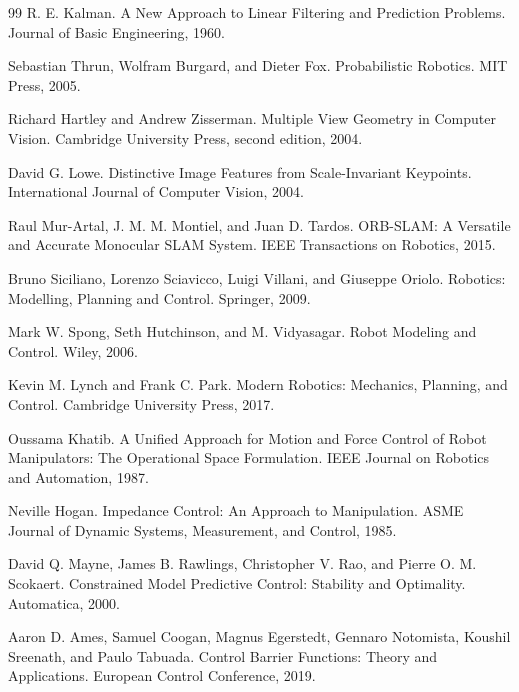 \documentclass[11pt,oneside,openany]{oblivoir}
\numberwithin{section}{chapter}
\numberwithin{subsection}{section}
\numberwithin{equation}{chapter}
\begin{document}
\backmatter

\clearpage

\begin{thebibliography}{99}
R. E. Kalman.
\newblock A New Approach to Linear Filtering and Prediction Problems.
\newblock Journal of Basic Engineering, 1960.

Sebastian Thrun, Wolfram Burgard, and Dieter Fox.
\newblock Probabilistic Robotics.
\newblock MIT Press, 2005.

Richard Hartley and Andrew Zisserman.
\newblock Multiple View Geometry in Computer Vision.
\newblock Cambridge University Press, second edition, 2004.

David G. Lowe.
\newblock Distinctive Image Features from Scale-Invariant Keypoints.
\newblock International Journal of Computer Vision, 2004.

Raul Mur-Artal, J. M. M. Montiel, and Juan D. Tardos.
\newblock ORB-SLAM: A Versatile and Accurate Monocular SLAM System.
\newblock IEEE Transactions on Robotics, 2015.

Bruno Siciliano, Lorenzo Sciavicco, Luigi Villani, and Giuseppe Oriolo.
\newblock Robotics: Modelling, Planning and Control.
\newblock Springer, 2009.

Mark W. Spong, Seth Hutchinson, and M. Vidyasagar.
\newblock Robot Modeling and Control.
\newblock Wiley, 2006.

Kevin M. Lynch and Frank C. Park.
\newblock Modern Robotics: Mechanics, Planning, and Control.
\newblock Cambridge University Press, 2017.

Oussama Khatib.
\newblock A Unified Approach for Motion and Force Control of Robot Manipulators: The Operational Space Formulation.
\newblock IEEE Journal on Robotics and Automation, 1987.

Neville Hogan.
\newblock Impedance Control: An Approach to Manipulation.
\newblock ASME Journal of Dynamic Systems, Measurement, and Control, 1985.

David Q. Mayne, James B. Rawlings, Christopher V. Rao, and Pierre O. M. Scokaert.
\newblock Constrained Model Predictive Control: Stability and Optimality.
\newblock Automatica, 2000.

Aaron D. Ames, Samuel Coogan, Magnus Egerstedt, Gennaro Notomista, Koushil Sreenath, and Paulo Tabuada.
\newblock Control Barrier Functions: Theory and Applications.
\newblock European Control Conference, 2019.


\end{thebibliography}
\end{document}
